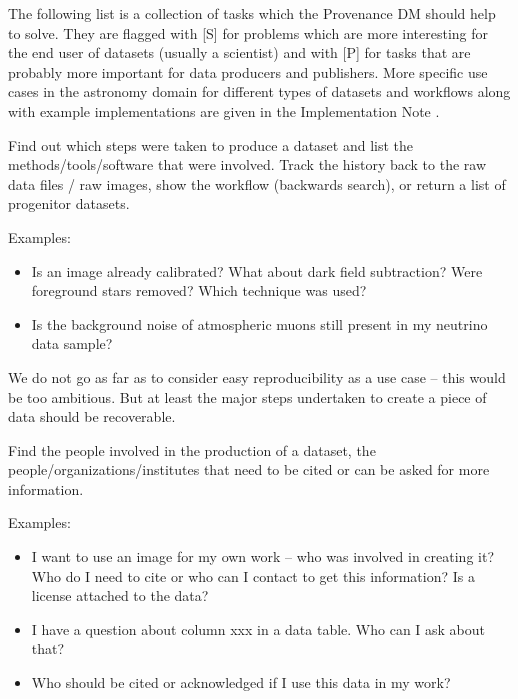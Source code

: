 The following list is a collection of tasks which the Provenance DM should help to solve. They are flagged with [S] for problems which are more interesting for the end user of datasets (usually a scientist) and with [P] for tasks that are probably more important for data producers and publishers.
More specific use cases in the astronomy domain for different types of datasets and workflows along with example implementations are given in the Implementation Note \citep{std:ProvenanceImplementationNote}.


        Find out which steps were taken to produce a dataset and list the
        methods\slash{}tools\slash{}software that were involved. Track the
        history back to the raw data files \slash{} raw images, show the
        workflow (backwards search), or return a list of progenitor datasets.

        \noindent Examples: 
        \begin{itemize}
            \item Is an image already calibrated?
What about dark field subtraction? Were foreground stars removed? Which technique
was used?  
            \item Is the background noise of atmospheric muons still present in my neutrino data sample?  
        \end{itemize}

        We do not go as far as to consider easy reproducibility as a use case -- this would be too ambitious. But at least the 
        major steps undertaken to create a piece of data should be recoverable.


        Find the people involved in the production of a dataset,
        the people\slash{}organizations\slash{}institutes that need to be cited
        or can be asked for more information.

        \noindent Examples: 
        \begin{itemize}
            \item I want to use an image for my own work -- who was involved in
creating it? Who do I need to cite or who can I contact to get this information? Is a license attached to the data? 
            \item I have a question about column xxx in a data
table. Who can I ask about that?  
            \item Who should be cited or acknowledged if I use this data in my work?
        \end{itemize}


